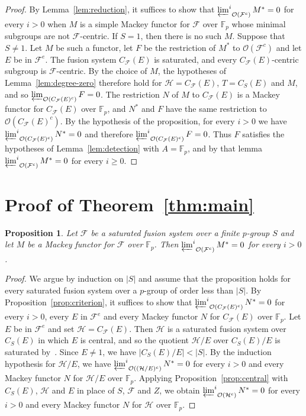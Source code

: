 \documentclass[10pt]{amsart}
\newtheorem{proposition}[theorem]{Proposition}
\theoremstyle{definition}
\numberwithin{equation}{section}
\renewcommand{\ge}{\geqslant}
\newcommand{\F}{\mathcal F}
\newcommand{\Hh}{\mathcal H}
\newcommand{\Op}{\mathcal O}
\newcommand{\limi}[2]{\mathop{\varprojlim\nolimits^{#1}}_{#2}}
\begin{document}
\begin{proof}
By Lemma~\ref{lem:reduction}, it suffices to show that $\limi{i}{\Op(\F^c)}M^*=0$ for every $i>0$ when $M$ is a simple Mackey functor for $\F$ over $\mathbb{F}_p$ whose minimal subgroups are not $\F$-centric. If $S=1$, then there is no such $M$. Suppose that $S\ne1$. Let $M$ be such a functor, let $F$ be the restriction of $M^*$ to $\Op(\F^c)$ and let $E$ be in $\F^e$. The fusion system $C_\F(E)$ is saturated, and every $C_\F(E)$-centric subgroup is $\F$\nobreakdash-centric. By the choice of $M$, the hypotheses of Lemma~\ref{lem:degree-zero} therefore hold for $\Hh=C_\F(E)$, $T=C_S(E)$ and $M$, and so $\varprojlim_{\Op(C_\F(E)^c)}F=0$. The restriction $N$ of $M$ to $C_\F(E)$ is a Mackey functor for $C_\F(E)$ over $\mathbb{F}_p$, and $N^*$ and $F$ have the same restriction to $\Op(C_\F(E)^c)$. By the hypothesis of the proposition, for every $i>0$ we have $\limi{i}{\Op(C_\F(E)^c)}N^*=0$ and therefore $\limi{i}{\Op(C_\F(E)^c)}F=0$. Thus $F$ satisfies the hypotheses of Lemma~\ref{lem:detection} with $A=\mathbb{F}_p$, and by that lemma $\limi{i}{\Op(\F^c)}M^*=0$ for every $i\ge0$.
\end{proof}
\section{Proof of Theorem~\ref{thm:main}}\label{sec:proof}
\begin{proposition}\label{prop:field}
Let $\F$ be a saturated fusion system over a finite $p$-group $S$ and let $M$ be a Mackey functor for $\F$ over $\mathbb{F}_p$. Then $\limi{i}{\Op(\F^c)}M^*=0$ for every $i>0$.
\end{proposition}

\begin{proof}
We argue by induction on $|S|$ and assume that the proposition holds for every saturated fusion system over a $p$-group of order less than $|S|$.
By Proposition~\ref{prop:criterion}, it suffices to show that $\limi{i}{\Op(C_\F(E)^c)}N^*=0$ for every $i>0$, every $E$ in $\F^e$ and every Mackey functor $N$ for $C_\F(E)$ over $\mathbb{F}_p$.
Let $E$ be in $\F^e$ and set $\Hh=C_\F(E)$.
Then $\Hh$ is a saturated fusion system over $C_S(E)$ in which $E$ is central, and so the quotient $\Hh/E$ over $C_S(E)/E$ is saturated by~\cite[Lemma~II.5.5]{AKO}.
Since $E\ne1$, we have $|C_S(E)/E|<|S|$.
By the induction hypothesis for $\Hh/E$, we have $\limi{i}{\Op((\Hh/E)^c)}N^*=0$ for every $i>0$ and every Mackey functor $N$ for $\Hh/E$ over $\mathbb{F}_p$.
Applying Proposition~\ref{prop:central} with $C_S(E)$, $\Hh$ and $E$ in place of $S$, $\F$ and $Z$, we obtain $\limi{i}{\Op(\Hh^c)}N^*=0$ for every $i>0$ and every Mackey functor $N$ for $\Hh$ over $\mathbb{F}_p$.
\end{proof}
\end{document}
